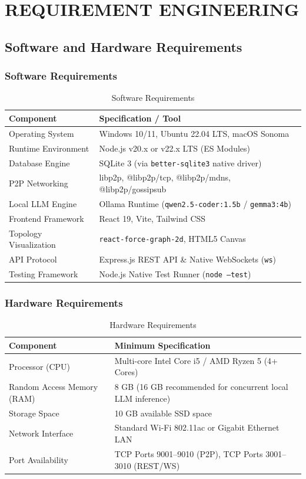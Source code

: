 \documentclass[12pt,a4paper]{report}
\begin{document}
\chapter{REQUIREMENT ENGINEERING}

\section{Software and Hardware Requirements}

\subsection{Software Requirements}
\begin{table}[H]
\centering
\caption{Software Requirements}
\label{tab:sw_req}
\begin{tabularx}{\textwidth}{|l|X|}
\hline
\textbf{Component} & \textbf{Specification / Tool} \\
\hline
Operating System & Windows 10/11, Ubuntu 22.04 LTS, macOS Sonoma \\
Runtime Environment & Node.js v20.x or v22.x LTS (ES Modules) \\
Database Engine & SQLite 3 (via \texttt{better-sqlite3} native driver) \\
P2P Networking & libp2p, @libp2p/tcp, @libp2p/mdns, @libp2p/gossipsub \\
Local LLM Engine & Ollama Runtime (\texttt{qwen2.5-coder:1.5b} / \texttt{gemma3:4b}) \\
Frontend Framework & React 19, Vite, Tailwind CSS \\
Topology Visualization & \texttt{react-force-graph-2d}, HTML5 Canvas \\
API Protocol & Express.js REST API \& Native WebSockets (\texttt{ws}) \\
Testing Framework & Node.js Native Test Runner (\texttt{node --test}) \\
\hline
\end{tabularx}
\end{table}

\subsection{Hardware Requirements}
\begin{table}[H]
\centering
\caption{Hardware Requirements}
\label{tab:hw_req}
\begin{tabularx}{\textwidth}{|l|X|}
\hline
\textbf{Component} & \textbf{Minimum Specification} \\
\hline
Processor (CPU) & Multi-core Intel Core i5 / AMD Ryzen 5 (4+ Cores) \\
Random Access Memory (RAM) & 8 GB (16 GB recommended for concurrent local LLM inference) \\
Storage Space & 10 GB available SSD space \\
Network Interface & Standard Wi-Fi 802.11ac or Gigabit Ethernet LAN \\
Port Availability & TCP Ports 9001--9010 (P2P), TCP Ports 3001--3010 (REST/WS) \\
\hline
\end{tabularx}
\end{table}
\end{document}
